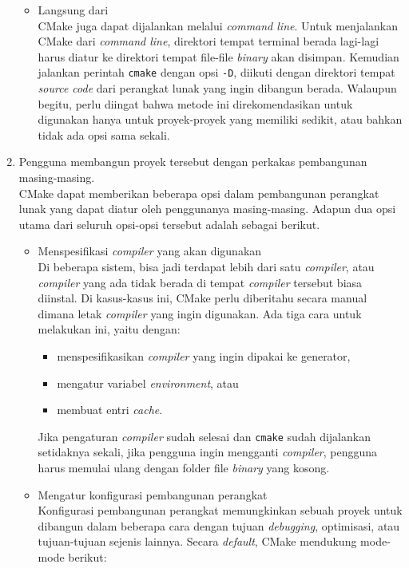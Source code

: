 \begin{enumerate}
\begin{itemize}
		\item Langsung dari \cl\\
		CMake juga dapat dijalankan melalui \textit{command line}. Untuk menjalankan CMake dari \textit{command line}, direktori tempat terminal berada lagi-lagi harus diatur ke direktori tempat file-file \textit{binary} akan disimpan. Kemudian jalankan perintah \verb|cmake| dengan opsi \verb|-D|, diikuti dengan direktori tempat \textit{source code} dari perangkat lunak yang ingin dibangun berada. Walaupun begitu, perlu diingat bahwa metode ini direkomendasikan untuk digunakan hanya untuk proyek-proyek yang memiliki sedikit, atau bahkan tidak ada opsi sama sekali.
	\end{itemize}
	
	\item Pengguna membangun proyek tersebut dengan perkakas pembangunan masing-masing.\\
	CMake dapat memberikan beberapa opsi dalam pembangunan perangkat lunak yang dapat diatur oleh penggunanya masing-masing. Adapun dua opsi utama dari seluruh opsi-opsi tersebut adalah sebagai berikut.
	
	\begin{itemize}
		\item Menspesifikasi \textit{compiler} yang akan digunakan\\
		Di beberapa sistem, bisa jadi terdapat lebih dari satu \textit{compiler}, atau \textit{compiler} yang ada tidak berada di tempat \textit{compiler} tersebut biasa diinstal. Di kasus-kasus ini, CMake perlu diberitahu secara manual dimana letak \textit{compiler} yang ingin digunakan. Ada tiga cara untuk melakukan ini, yaitu dengan:
		
		\begin{itemize}
			\item menspesifikasikan \textit{compiler} yang ingin dipakai ke generator,
			\item mengatur variabel \textit{environment}, atau
			\item membuat entri \textit{cache}.
		\end{itemize}
		
		Jika pengaturan \textit{compiler} sudah selesai dan \verb|cmake| sudah dijalankan setidaknya sekali, jika pengguna ingin mengganti \textit{compiler}, pengguna harus memulai ulang dengan folder file \textit{binary} yang kosong.
		\item Mengatur konfigurasi pembangunan perangkat\\
		Konfigurasi pembangunan perangkat memungkinkan sebuah proyek untuk dibangun dalam beberapa cara dengan tujuan \textit{debugging}, optimisasi, atau tujuan-tujuan sejenis lainnya. Secara \textit{default}, CMake mendukung mode-mode berikut:
		

\end{itemize}
\end{enumerate}
